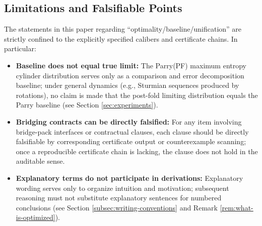 \subsection{Limitations and Falsifiable Points}\label{subsec:limitations-falsifiable}
The statements in this paper regarding ``optimality/baseline/unification'' are strictly confined to the explicitly specified calibers and certificate chains. In particular:
\begin{itemize}
  \item \textbf{Baseline does not equal true limit:} The Parry(PF) maximum entropy cylinder distribution serves only as a comparison and error decomposition baseline; under general dynamics (e.g., Sturmian sequences produced by rotations), no claim is made that the post-fold limiting distribution equals the Parry baseline (see Section \ref{sec:experiments}).
  \item \textbf{Bridging contracts can be directly falsified:} For any item involving bridge-pack interfaces or contractual clauses, each clause should be directly falsifiable by corresponding certificate output or counterexample scanning; once a reproducible certificate chain is lacking, the clause does not hold in the auditable sense.
  \item \textbf{Explanatory terms do not participate in derivations:} Explanatory wording serves only to organize intuition and motivation; subsequent reasoning must not substitute explanatory sentences for numbered conclusions (see Section \ref{subsec:writing-conventions} and Remark \ref{rem:what-is-optimized}).
\end{itemize}

